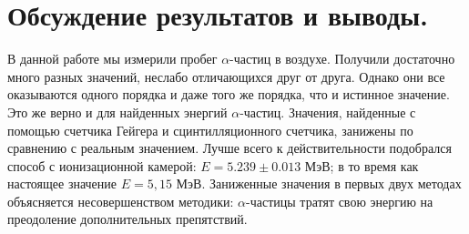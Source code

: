\documentclass{article}
\begin{document}
	\newpage
	\section{Обсуждение результатов и выводы.}
	
	\begin{table}[h!]
		\centering
	\end{table}
	
	В данной работе мы измерили пробег $\alpha$-частиц в воздухе. Получили достаточно много разных значений, неслабо отличающихся друг от друга. Однако они все оказываются одного порядка и даже того же порядка, что и истинное значение. Это же верно и для найденных энергий $\alpha$-частиц. Значения, найденные с помощью счетчика Гейгера и сцинтилляционного счетчика, занижены по сравнению с реальным значением. Лучше всего к действительности подобрался способ с ионизационной камерой: $E = 5.239 \pm 0.013$ МэВ; в то время как настоящее значение $E = 5,15$ МэВ. Заниженные значения в первых двух методах объясняется несовершенством методики: $\alpha$-частицы тратят свою энергию на преодоление дополнительных препятствий. 
	
	
	
\end{document}
